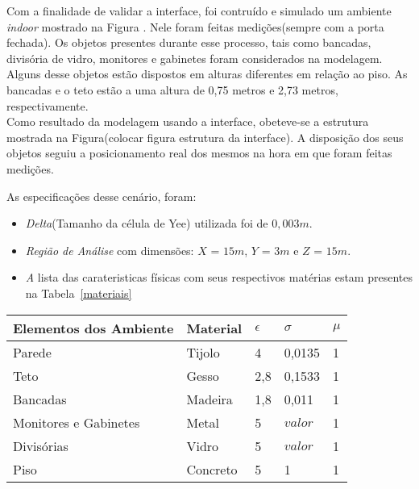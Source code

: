 Com a finalidade de validar a interface, foi contruído e simulado um ambiente \textit{indoor} mostrado na Figura%
. Nele foram feitas medições(sempre com a porta fechada). Os objetos presentes durante esse processo, tais como bancadas, divisória de vidro, monitores e gabinetes foram considerados na modelagem.\\

Alguns desse objetos estão dispostos em alturas diferentes em relação ao piso. As bancadas e o teto estão a uma altura de 0,75 metros e 2,73 metros, respectivamente.\\

Como resultado da modelagem usando a interface, obeteve-se a estrutura mostrada na Figura(colocar figura estrutura da interface). A disposição dos seus objetos seguiu a posicionamento real dos mesmos na hora em que foram feitas medições.

As especificações desse cenário, foram:
\begin{itemize}
	\item \textit{Delta}(Tamanho da célula de Yee) utilizada foi de $0,003m$.
	\item \textit{Região de Análise} com dimensões: $X$ = $15m$, $Y$ = $3m$ e $Z$ = $15m$.
	\item \textit A lista das carateristicas físicas com seus respectivos matérias estam presentes na Tabela~\ref{materiais}
\end{itemize}

\begin{center}
\begin{tabular}{|l|l|l|l||l|}
	\hline
	Elementos dos Ambiente & Material & $\epsilon$ & $\sigma$ & $\mu$ \\ \hline
	Parede & Tijolo & 4 & 0,0135 & 1\\ \hline
	Teto & Gesso & 2,8 & 0,1533 & 1 \\ \hline
	Bancadas & Madeira & 1,8 & 0,011 & 1\\ \hline
	Monitores e Gabinetes & Metal & 5 & $valor$ & 1\\ \hline
	Divisórias & Vidro & 5 & $valor$ & 1 \\ \hline
	Piso & Concreto & 5 & 1 & 1 \\
	\hline
\end{tabular}
\label{materiais}
\end{center}

